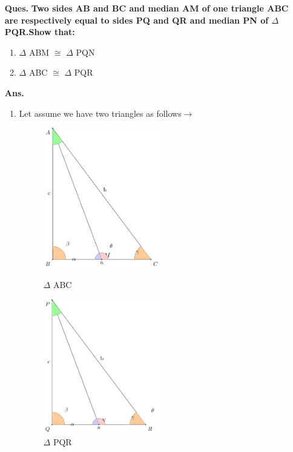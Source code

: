 \begin{enumerate}
		\item[\textbf{Ques.}] 
		\textbf{ Two sides AB and BC and median AM of one
		triangle ABC are respectively equal to sides PQ
		and QR and median PN of $\Delta$ PQR.Show that:}

	\begin{enumerate}
		\item$\Delta$ ABM $\cong$ $\Delta$ PQN  
		\item$\Delta$ ABC $\cong$ $\Delta$ PQR
	\end{enumerate}
	
	\item [\textbf{Ans.}]

	\begin{enumerate}
		\item Let assume we have two triangles as follows$\to$\\
		\begin{figure}[!htb]
			\begin{minipage}{0.48\textwidth}
				\centering
				\includegraphics[width=2.0in]{./figures/congurentpicabc.pdf}
				\caption{$\Delta$ ABC}
				\label{fig:triangle}
	    	\end{minipage}
	    	\hfill
	    	\begin{minipage}{0.48\textwidth}
				\centering
				\includegraphics[width=2.0in]{./figures/congurentpicabc2.pdf}
				\caption{$\Delta$ PQR }
				\label{fig:triangle2}
	   	 	\end{minipage}	
    	\end{figure}


\end{enumerate}
\end{enumerate}

